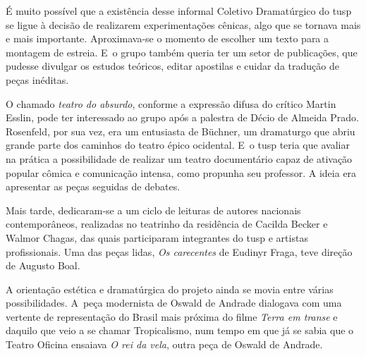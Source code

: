 É muito possível que a existência desse informal Coletivo Dramatúrgico
do {\sc tusp} se ligue à decisão de realizarem experimentações cênicas, algo
que se tornava mais e mais importante. Aproximava-se o momento de
escolher um texto para a montagem de estreia. E~o grupo também queria ter
um setor de publicações, que pudesse divulgar os estudos teóricos,
editar apostilas e cuidar da tradução de peças inéditas.


O chamado {\it teatro do absurdo}, conforme a expressão difusa
do crítico Martin Esslin, pode ter interessado ao grupo após a
palestra de Décio de Almeida Prado. Rosenfeld, por sua vez, era um
entusiasta de Büchner, um dramaturgo que abriu grande parte dos caminhos
do teatro épico ocidental. E~o {\sc tusp} teria que avaliar na prática a
possibilidade de realizar um teatro documentário capaz de ativação
popular cômica e comunicação intensa, como propunha seu professor. A
ideia era apresentar as peças seguidas de debates.


Mais tarde, dedicaram-se a um ciclo de leituras de autores nacionais
contemporâneos, realizadas no teatrinho da residência de Cacilda Becker
e Walmor Chagas, das quais participaram integrantes do {\sc tusp} e artistas
profissionais. Uma das peças lidas, {\it Os carecentes} de Eudinyr
Fraga, teve direção de Augusto Boal.

A orientação estética e dramatúrgica do projeto ainda se movia entre
várias possibilidades. A~peça modernista de Oswald de Andrade dialogava
com uma vertente de representação do Brasil mais próxima do filme
{\it Terra em transe} e daquilo que veio a se chamar Tropicalismo, num
tempo em que já se sabia que o Teatro Oficina ensaiava {\it O rei da
vela}, outra peça de Oswald de Andrade.

